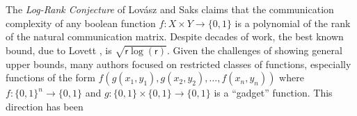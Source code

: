 The \textit{Log-Rank Conjecture} of Lov\'{a}sz and Saks \cite{Lovasz1988} claims that the communication complexity of any boolean function $f: X\times Y \to \{0,1\}$ is a polynomial of the rank of the natural communication matrix. Despite decades of work, the best known bound, due to Lovett \cite{Lovett2013}, is $\sqrt{\mathsf{r}\log(\mathsf{r})}$. Given the challenges of showing general upper bounds, many authors focused on restricted classes of functions, especially functions of the form $f(g(x_1,y_1),g(x_2,y_2),\dots,f(x_n,y_n))$ where $f : \{0,1\}^n \to \{0,1\}$ and $g : \{0,1\}\times\{0,1\}\to\{0,1\}$ is a ``gadget'' function. This direction has been 